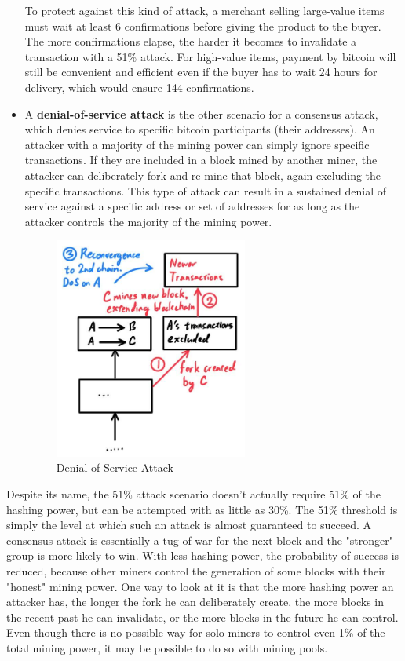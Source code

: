 \documentclass{article}
\begin{document}
\begin{itemize}
      To protect against this kind of attack, a merchant selling large-value items must wait at least 6 confirmations before giving the product to the buyer. The more confirmations elapse, the harder it becomes to invalidate a transaction with a 51\% attack. For high-value items, payment by bitcoin will still be convenient and efficient even if the buyer has to wait 24 hours for delivery, which would ensure 144 confirmations.

      \item A \textbf{denial-of-service attack} is the other scenario for a consensus attack, which denies service to specific bitcoin participants (their addresses). An attacker with a majority of the mining power can simply ignore specific transactions. If they are included in a block mined by another miner, the attacker can deliberately fork and re-mine that block, again excluding the specific transactions. This type of attack can result in a sustained denial of service against a specific address or set of addresses for as long as the attacker controls the majority of the mining power.

      \begin{figure}[H]
      \centering
      \includegraphics[width=0.6\textwidth]{img/DoS_Attack.jpg}
      \caption{Denial-of-Service Attack}
      \end{figure}
    \end{itemize}

    Despite its name, the 51\% attack scenario doesn't actually require 51\% of the hashing power, but can be attempted with as little as 30\%. The 51\% threshold is simply the level at which such an attack is almost guaranteed to succeed. A consensus attack is essentially a tug-of-war for the next block and the "stronger" group is more likely to win. With less hashing power, the probability of success is reduced, because other miners control the generation of some blocks with their "honest" mining power. One way to look at it is that the more hashing power an attacker has, the longer the fork he can deliberately create, the more blocks in the recent past he can invalidate, or the more blocks in the future he can control. Even though there is no possible way for solo miners to control even 1\% of the total mining power, it may be possible to do so with mining pools.
\end{document}
